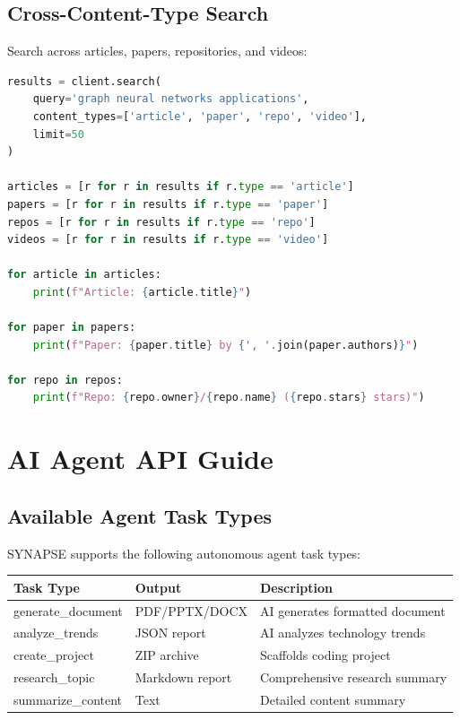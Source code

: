 \documentclass{report}
\begin{document}
\section{Cross-Content-Type Search}

Search across articles, papers, repositories, and videos:

\begin{lstlisting}[language=Python]
results = client.search(
    query='graph neural networks applications',
    content_types=['article', 'paper', 'repo', 'video'],
    limit=50
)

articles = [r for r in results if r.type == 'article']
papers = [r for r in results if r.type == 'paper']
repos = [r for r in results if r.type == 'repo']
videos = [r for r in results if r.type == 'video']

for article in articles:
    print(f"Article: {article.title}")

for paper in papers:
    print(f"Paper: {paper.title} by {', '.join(paper.authors)}")

for repo in repos:
    print(f"Repo: {repo.owner}/{repo.name} ({repo.stars} stars)")
\end{lstlisting}

\chapter{AI Agent API Guide}

\section{Available Agent Task Types}

SYNAPSE supports the following autonomous agent task types:

\begin{center}
\begin{tabular}{llp{4cm}}
\toprule
\textbf{Task Type} & \textbf{Output} & \textbf{Description} \\
\midrule
generate\_document & PDF/PPTX/DOCX & AI generates formatted document \\
analyze\_trends & JSON report & AI analyzes technology trends \\
create\_project & ZIP archive & Scaffolds coding project \\
research\_topic & Markdown report & Comprehensive research summary \\
summarize\_content & Text & Detailed content summary \\
\bottomrule
\end{tabular}
\end{center}
\end{document}
